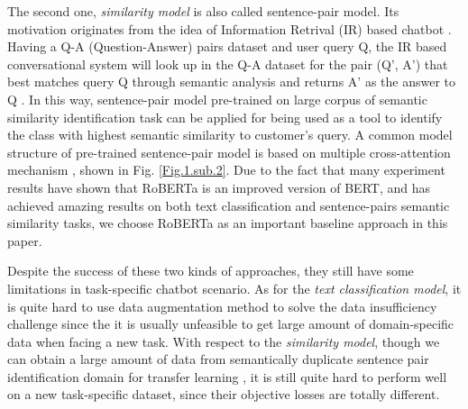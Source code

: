 \documentclass[letterpaper]{article} %
\begin{document}
  The  second  one,  \emph{similarity model} is also called sentence-pair model.
  Its  motivation  originates  from  the idea of Information Retrival (IR) based
  chatbot   \cite{jafarpour2010filter,   leuski2011npceditor}.   Having   a  Q-A
  (Question-Answer)  pairs dataset and user query Q, the IR based conversational
  system will look up in the Q-A dataset for the pair (Q', A') that best matches
  query  Q  through  semantic  analysis  and  returns  A'  as  the  answer  to Q
  \cite{mnasri2019recent}. In this way, sentence-pair model pre-trained on large
  corpus  of  semantic  similarity  identification task can be applied for being
  used  as  a  tool  to  identify  the class with highest semantic similarity to
  customer's    query.    A    common    model    structure    of    pre-trained
  \cite{devlin2018bert} sentence-pair model is based on multiple cross-attention
  mechanism  \cite{barkan2020scalable},  shown in Fig. \ref{Fig.1.sub.2}. Due to
  the   fact   that   many   experiment   results   have   shown   that  RoBERTa
  \cite{liu2019roberta} is an improved version of BERT, and has achieved amazing
  results  on  both  text  classification and sentence-pairs semantic similarity
  tasks, we choose RoBERTa as an important baseline approach in this paper.

  Despite  the  success  of  these two kinds of approaches, they still have some
  limitations   in   task-specific  chatbot  scenario.  As  for  the  \emph{text
  classification  model},  it  is  quite hard to use data augmentation method to
  solve  the  data insufficiency challenge since the it is usually unfeasible to
  get  large amount of domain-specific data when facing a new task. With respect
  to  the  \emph{similarity model}, though we can obtain a large amount of data
  from semantically  duplicate  sentence  pair identification domain for transfer
  learning  \cite{sun2019fine},  it  is  still  quite  hard  to  perform well on
  a new task-specific dataset,  since their objective losses are totally different. 
\end{document}
